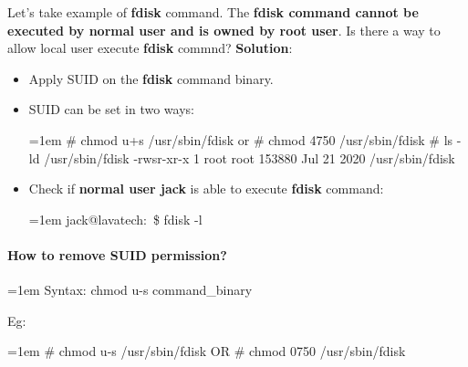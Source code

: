 \begin{flushleft}
	Let's take example of \textbf{fdisk} command. 
	\newline
	The \textbf{fdisk command cannot be executed by normal user and is owned by root user}. Is there a way to allow local user execute \textbf{fdisk} commnd?
	\newline
	\textbf{Solution}: 
	\begin{itemize}
		\item Apply SUID on the \textbf{fdisk} command binary.
		\item 	SUID can be set in two ways:
		\bigskip
		\begin{tcolorbox}[breakable,notitle,boxrule=-0pt,colback=black,colframe=black]
			\color{green}
			\font=1em
			\# chmod u+s  /usr/sbin/fdisk
			\newline
			or
			\newline
			\# chmod 4750 /usr/sbin/fdisk
			\newline
			\newline
			\# ls -ld /usr/sbin/fdisk
			\newline
			\color{white}
			-rwsr-xr-x 1 root root 153880 Jul 21  2020 /usr/sbin/fdisk
			\font=4pt
		\end{tcolorbox}
		\item Check if \textbf{normal user jack} is able to execute \textbf{fdisk} command:
		\begin{tcolorbox}[breakable,notitle,boxrule=-0pt,colback=black,colframe=black]
			\color{green}
			\font=1em
			jack@lavatech:~\$ fdisk -l
			\font=4pt
		\end{tcolorbox}
	\end{itemize}
	\paragraph{How to remove SUID permission?}
	\bigskip
	\begin{tcolorbox}[breakable,notitle,boxrule=0pt,colback=pink,colframe=pink]
		\color{black}
		\font=1em
		Syntax: chmod u-s command\_binary
		\font=4pt
	\end{tcolorbox}
	Eg:
	\begin{tcolorbox}[breakable,notitle,boxrule=-0pt,colback=black,colframe=black]
		\color{green}
		\font=1em
		\# chmod u-s  /usr/sbin/fdisk
		\newline
		\color{white}
		OR
		\color{green}
		\newline
		\# chmod 0750 /usr/sbin/fdisk
		\font=4pt
	\end{tcolorbox}

	
\end{flushleft}

\newpage

